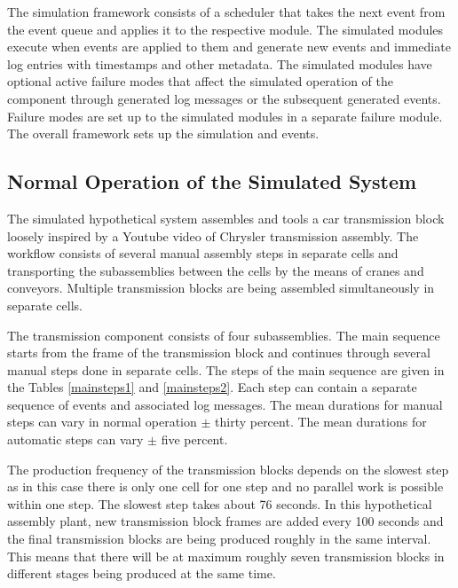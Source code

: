 \documentclass[journal]{IEEEtran}
\begin{document}
The simulation framework consists of a scheduler that takes the next event from the event queue and applies it to the respective module. The simulated modules
execute when events are applied to them and generate new events and immediate log entries with timestamps and other metadata.
The simulated modules have optional active failure modes that affect the simulated operation of the component through
generated log messages or the subsequent generated events. Failure modes are set up to the simulated modules in a separate failure module.
The overall framework sets up the simulation and events.

\subsection{Normal Operation of the Simulated System}
The simulated hypothetical system assembles and tools a car transmission block loosely inspired by a Youtube video of Chrysler transmission assembly\cite{transmission}.
The workflow consists of several manual assembly steps in separate cells and transporting the subassemblies between the cells by the means of
cranes and conveyors. Multiple transmission blocks are being assembled simultaneously in separate cells.

The transmission component consists of four subassemblies. The main sequence starts from the frame of the transmission block
and continues through several manual steps done in separate cells. The steps of the main sequence are given in
the Tables \ref{mainsteps1} and \ref{mainsteps2}.
Each step can contain a separate sequence of events and associated log messages.
The mean durations for manual steps can vary in normal operation $\pm$ thirty percent. The mean durations for automatic steps can vary
$\pm$ five percent.

The production frequency of the transmission blocks depends on the slowest step as in this case there is only one cell for one step and no
parallel work is possible within one step. The slowest step takes about 76 seconds. In this hypothetical assembly plant, new transmission block
frames are added every 100 seconds and the final transmission blocks are being produced roughly in the same interval. This means that there
will be at maximum roughly seven transmission blocks in different stages being produced at the same time.
\end{document}
